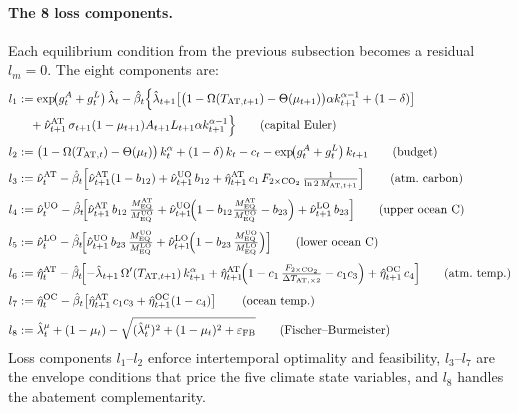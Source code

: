\documentclass[11pt,a4paper]{report}
\begin{document}
\paragraph{The 8 loss components.}
Each equilibrium condition from the previous subsection becomes a residual $l_m = 0$.  The eight components are:
{\small
\begin{align}
l_1 &:= \exp\!\bigl(g^A_t + g^L_t\bigr)\,\hat{\lambda}_t - \hat{\beta}_t\Bigl\{\hat{\lambda}_{t+1}\bigl[\bigl(1-\Omega(T_{\mathrm{AT},t+1}) - \Theta(\mu_{t+1})\bigr)\alpha k_{t+1}^{\alpha-1} + (1-\delta)\bigr] \nonumber\\
    &\quad + \hat{\nu}^{\mathrm{AT}}_{t+1}\,\sigma_{t+1}(1-\mu_{t+1})A_{t+1}L_{t+1}\alpha k_{t+1}^{\alpha-1}\Bigr\}
    \tag*{\text{(capital Euler)}}\label{eq:iam_l1}\\[3pt]
l_2 &:= \bigl(1-\Omega(T_{\mathrm{AT},t}) - \Theta(\mu_t)\bigr)\,k_t^\alpha + (1-\delta)\,k_t - c_t - \exp\!\bigl(g^A_t + g^L_t\bigr)\,k_{t+1}
    \tag*{\text{(budget)}}\label{eq:iam_l2}\\[3pt]
l_3 &:= \hat{\nu}^{\mathrm{AT}}_t - \hat{\beta}_t\!\left[\hat{\nu}^{\mathrm{AT}}_{t+1}(1-b_{12}) + \hat{\nu}^{\mathrm{UO}}_{t+1}\,b_{12} + \hat{\eta}^{\mathrm{AT}}_{t+1}\,c_1\,F_{\mathrm{2\times CO_2}}\,\tfrac{1}{\ln 2\,M_{\mathrm{AT},t+1}}\right]
    \tag*{\text{(atm.\ carbon)}}\label{eq:iam_l3}\\[3pt]
l_4 &:= \hat{\nu}^{\mathrm{UO}}_t - \hat{\beta}_t\!\Bigl[\hat{\nu}^{\mathrm{AT}}_{t+1}\,b_{12}\,\tfrac{M^{\mathrm{AT}}_{\mathrm{EQ}}}{M^{\mathrm{UO}}_{\mathrm{EQ}}} + \hat{\nu}^{\mathrm{UO}}_{t+1}\!\Bigl(1-b_{12}\tfrac{M^{\mathrm{AT}}_{\mathrm{EQ}}}{M^{\mathrm{UO}}_{\mathrm{EQ}}}-b_{23}\Bigr) + \hat{\nu}^{\mathrm{LO}}_{t+1}\,b_{23}\Bigr]
    \tag*{\text{(upper ocean C)}}\label{eq:iam_l4}\\[3pt]
l_5 &:= \hat{\nu}^{\mathrm{LO}}_t - \hat{\beta}_t\!\Bigl[\hat{\nu}^{\mathrm{UO}}_{t+1}\,b_{23}\,\tfrac{M^{\mathrm{UO}}_{\mathrm{EQ}}}{M^{\mathrm{LO}}_{\mathrm{EQ}}} + \hat{\nu}^{\mathrm{LO}}_{t+1}\!\Bigl(1-b_{23}\,\tfrac{M^{\mathrm{UO}}_{\mathrm{EQ}}}{M^{\mathrm{LO}}_{\mathrm{EQ}}}\Bigr)\Bigr]
    \tag*{\text{(lower ocean C)}}\label{eq:iam_l5}\\[3pt]
l_6 &:= \hat{\eta}^{\mathrm{AT}}_t - \hat{\beta}_t\!\Bigl[-\hat{\lambda}_{t+1}\,\Omega'(T_{\mathrm{AT},t+1})\,k_{t+1}^\alpha + \hat{\eta}^{\mathrm{AT}}_{t+1}\!\Bigl(1-c_1\,\tfrac{F_{\mathrm{2\times CO_2}}}{\Delta T_{\mathrm{AT},\times 2}}-c_1 c_3\Bigr) + \hat{\eta}^{\mathrm{OC}}_{t+1}\,c_4\Bigr]
    \tag*{\text{(atm.\ temp.)}}\label{eq:iam_l6}\\[3pt]
l_7 &:= \hat{\eta}^{\mathrm{OC}}_t - \hat{\beta}_t\!\left[\hat{\eta}^{\mathrm{AT}}_{t+1}\,c_1 c_3 + \hat{\eta}^{\mathrm{OC}}_{t+1}(1-c_4)\right]
    \tag*{\text{(ocean temp.)}}\label{eq:iam_l7}\\[3pt]
l_8 &:= \hat{\lambda}^\mu_t + (1-\mu_t) - \sqrt{(\hat{\lambda}^\mu_t)^2 + (1-\mu_t)^2 + \varepsilon_{\mathrm{FB}}}
    \tag*{\text{(Fischer--Burmeister)}}\label{eq:iam_l8}
\end{align}
}
Loss components $l_1$--$l_2$ enforce intertemporal optimality and feasibility, $l_3$--$l_7$ are the envelope conditions that price the five climate state variables, and $l_8$ handles the abatement complementarity.
\end{document}
